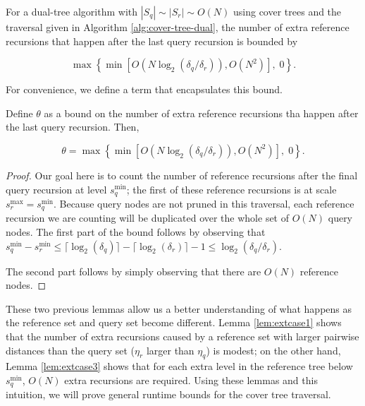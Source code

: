 \begin{lemma}
\label{lem:extcase3}
For a dual-tree algorithm with $|S_q| \sim |S_r| \sim O(N)$ using cover trees and
the traversal given in Algorithm \ref{alg:cover-tree-dual}, the number of extra
reference recursions that happen after the last query recursion is bounded by

\begin{equation}
\max\left\{\min\left[O(N \log_2(\delta_q / \delta_r)),
O(N^2)\right], \; 0\right\}.
\end{equation}
\end{lemma}

For convenience, we define a term that encapsulates this bound.

\begin{defn}
Define $\theta$ as a bound on the number of extra reference recursions tha
happen after the last query recursion.  Then,

\begin{equation}
\theta = \max\left\{\min\left[O(N \log_2(\delta_q / \delta_r)), O(N^2)\right],
\; 0\right\}.
\end{equation}
\end{defn}

\begin{proof}
Our goal here is to count the number of reference recursions after the final
query recursion at level $s_q^{\min}$; the first of these reference recursions
is at scale $s_r^{\max} = s_q^{\min}$.  Because query nodes are not pruned in
this traversal, each reference recursion we are counting will be duplicated over
the whole set of $O(N)$ query nodes.  The first part of the bound follows by
observing that
$s_q^{\min} - s_r^{\min} \le \lceil \log_2(\delta_q) \rceil -
\lceil \log_2(\delta_r) \rceil - 1 \le \log_2(\delta_q / \delta_r)$.

The second part follows by simply observing that there are $O(N)$ reference
nodes.
\end{proof}

These two previous lemmas allow us a better understanding of what happens as the
reference set and query set become different.  Lemma \ref{lem:extcase1} shows
that the number of extra recursions caused by a reference set with larger
pairwise distances than the query set ($\eta_r$ larger than $\eta_q$) is modest;
on the other hand, Lemma \ref{lem:extcase3} shows that for each extra level in
the reference tree below $s_q^{\min}$, $O(N)$ extra recursions are required.
Using these lemmas and this intuition, we will prove general runtime bounds for
the cover tree traversal.

